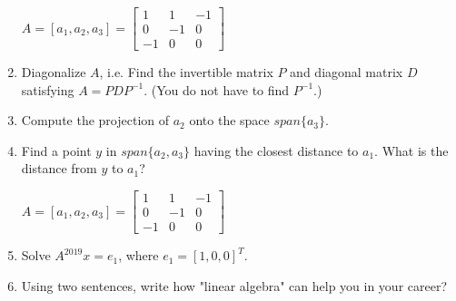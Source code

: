 \documentclass[11pt]{amsart}
\begin{document}
\begin{enumerate}
\newpage
$A = [a_1, a_2, a_3] = 
\begin{bmatrix}
1 & 1 & -1\\
0 & -1 & 0\\
-1 & 0 & 0 
\end{bmatrix}
$

\item  Diagonalize $A$, i.e. Find the invertible matrix $P$ and diagonal matrix $D$ satisfying $A = P D P^{-1}.$ (You do not have to find $P^{-1}$.)
\vspace{.5in}\vspace{.5in}\vspace{.5in}\vspace{.5in}



\item 
Compute the projection of $a_2$ onto the space $span\{a_3\}$.
\vspace{.5in}\vspace{.5in}
\vspace{.5in}\vspace{.5in}


\item Find a point $y$ in $span\{a_2, a_3\}$ having the closest distance to $a_1$. What is the distance from $y$ to $a_1$?

\vspace{.5in}\vspace{.5in}
\vspace{.5in}\vspace{.5in}


\newpage
$A = [a_1, a_2, a_3] = 
\begin{bmatrix}
1 & 1 & -1\\
0 & -1 & 0\\
-1 & 0 & 0 
\end{bmatrix}
$

\item Solve $A^{2019} x = e_1$, where $e_1 = [1, 0, 0]^T$.

\vspace{.5in}\vspace{.5in}
\vspace{.5in}\vspace{.5in}
\vspace{.5in}\vspace{.5in}


\item Using two sentences, write how "linear algebra" can help you in your career? 




\end{enumerate}
\end{document}
